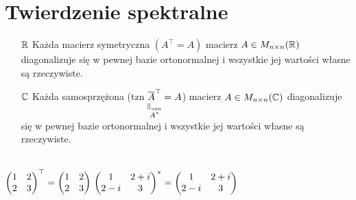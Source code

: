 \section{Twierdzenie spektralne}
\begin{tw}[spektralne] \hfill
  \begin{itemize}
    \item[$\mathbb{R}$] Każda macierz symetryczna $(A^\top = A)$ macierz $A \in M_{n \times n}(\mathbb{R})$
    diagonalizuje się w pewnej bazie ortonormalnej i wszystkie jej wartości
    własne są rzeczywiste.
    \item[$\mathbb{C}$] Każda samosprzężona (tzn $\underscript{\overline A^\top}
    {\verteq \text{ozn}}{A^*} = A$) macierz $A \in M_{n \times n}(\mathbb{C})$ diagonalizuje
    się w pewnej bazie ortonormalnej i wszystkie jej wartości własne są
    rzeczywiste.
  \end{itemize}
\end{tw}

\begin{prz} ~\\
  $\begin{pmatrix} 1 & 2 \\ 2 & 3 \end{pmatrix}^\top =
  \begin{pmatrix} 1 & 2 \\ 2 & 3 \end{pmatrix} \\
    \begin{pmatrix} 1 & 2+i \\ 2-i & 3 \end{pmatrix}^* =
      \begin{pmatrix} 1 & 2+i \\ 2-i & 3 \end{pmatrix}$
\end{prz}

